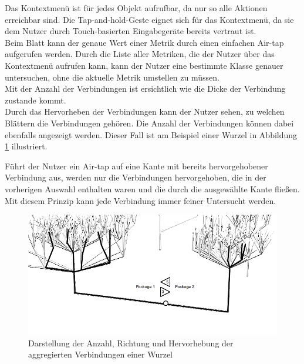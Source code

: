 \noindent Das Kontextmenü ist für jedes Objekt aufrufbar, da nur so alle Aktionen erreichbar sind. Die Tap-and-hold-Geste eignet sich für das Kontextmenü, da sie dem Nutzer durch Touch-basierten Eingabegeräte bereits vertraut ist.\\

\noindent Beim Blatt kann der genaue Wert einer Metrik durch einen einfachen Air-tap aufgerufen werden. Durch die Liste aller Metriken, die der Nutzer über das Kontextmenü aufrufen kann, kann der Nutzer eine bestimmte Klasse genauer untersuchen, ohne die aktuelle Metrik umstellen zu müssen.\\

\noindent Mit der Anzahl der Verbindungen ist ersichtlich wie die Dicke der Verbindung zustande kommt.\\

\noindent Durch das Hervorheben der Verbindungen kann der Nutzer sehen, zu welchen Blättern die Verbindungen gehören. Die Anzahl der Verbindungen können dabei ebenfalls angezeigt werden. Dieser Fall ist am Beispiel einer Wurzel in Abbildung \ref{fig:root-interaction} illustriert. 

Führt der Nutzer ein Air-tap auf eine Kante mit bereits hervorgehobener Verbindung aus, werden nur die Verbindungen hervorgehoben, die in der vorherigen Auswahl enthalten waren und die durch die ausgewählte Kante fließen. Mit diesem Prinzip kann jede Verbindung immer feiner Untersucht werden.\\

\begin{figure}[htb]
  \includegraphics[width=\textwidth]{figures/root-interaction}
  \caption{Darstellung der Anzahl, Richtung und Hervorhebung der aggregierten Verbindungen einer Wurzel}
  \label{fig:root-interaction}
\end{figure}


